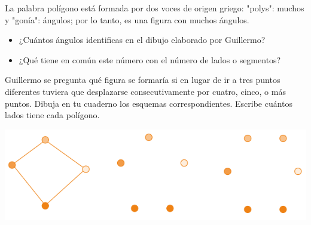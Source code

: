\documentclass[letterpaper,11pt,twoside]{article}
\begin{document}
\begin{multicols}{2}
La palabra polígono está formada por dos voces de origen griego: "polys": muchos y "gonía": ángulos; por lo tanto,
es una figura con muchos ángulos.
\begin{itemize}
\item ¿Cuántos ángulos identificas en el dibujo elaborado por
Guillermo?
\item ¿Qué tiene en común este número con el número de
lados o segmentos?
\end{itemize}
Guillermo se pregunta qué figura se formaría si en lugar
de ir a tres puntos diferentes tuviera que desplazarse consecutivamente por cuatro, cinco, o más puntos. Dibuja en
tu cuaderno los esquemas correspondientes. Escribe cuántos
lados tiene cada polígono.
\begin{center}
\includegraphics[scale=.4]{Images/poligonos.png} 
\end{center} 

\end{multicols}
\end{document}
